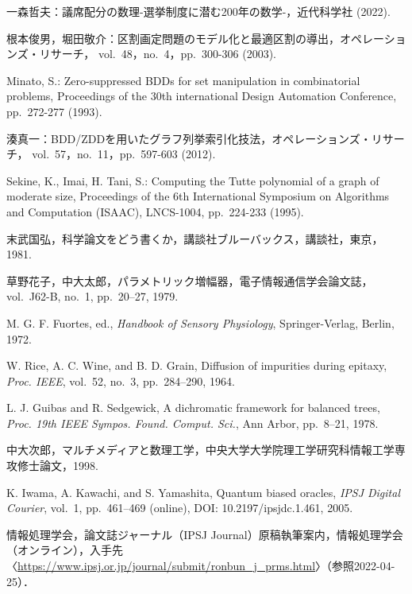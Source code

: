 ﻿\documentclass[a4j,12pt]{jreport}
\begin{document}
\begin{thebibliography}{99}

一森哲夫：議席配分の数理-選挙制度に潜む200年の数学-，近代科学社 (2022).

根本俊男，堀田敬介：区割画定問題のモデル化と最適区割の導出，オペレーションズ・リサーチ，
vol.~48，no.~4，pp.~300-306 (2003).

Minato, S.: Zero-suppressed BDDs for set manipulation in combinatorial problems,
Proceedings of the 30th international Design Automation Conference,
pp.~272-277 (1993).

湊真一：BDD/ZDDを用いたグラフ列挙索引化技法，オペレーションズ・リサーチ，
vol.~57，no.~11，pp.~597-603 (2012).

Sekine, K., Imai, H. Tani, S.: Computing the Tutte polynomial of a graph of moderate size,
Proceedings of the 6th International Symposium on Algorithms and Computation (ISAAC),
LNCS-1004, pp.~224-233 (1995).

末武国弘，科学論文をどう書くか，講談社ブルーバックス，講談社，東京，1981.

草野花子，中大太郎，パラメトリック増幅器，電子情報通信学会論文誌，vol.~J62-B, no.~1, pp.~20--27, 1979. 

M. G. F. Fuortes, ed., \textit{Handbook of Sensory Physiology}, Springer-Verlag, Berlin, 1972.

W. Rice, A. C. Wine, and B. D. Grain, Diffusion of impurities during epitaxy, \textit{Proc. IEEE}, vol.~52, no.~3, pp.~284--290, 1964.

L. J. Guibas and R. Sedgewick, A dichromatic framework for balanced trees, 
\textit{Proc. 19th IEEE Sympos. Found. Comput. Sci.}, Ann Arbor, pp.~8--21, 1978.

中大次郎，マルチメディアと数理工学，中央大学大学院理工学研究科情報工学専攻修士論文，1998.

K. Iwama, A. Kawachi, and S. Yamashita, Quantum biased oracles, \textit{IPSJ Digital Courier}, vol.~1, pp.~461--469 (online), DOI: 10.2197/ipsjdc.1.461, 2005.

情報処理学会，論文誌ジャーナル（IPSJ Journal）原稿執筆案内，情報処理学会（オンライン），入手先〈\url{https://www.ipsj.or.jp/journal/submit/ronbun_j_prms.html}〉（参照2022-04-25）．


\end{thebibliography}

\end{document}
